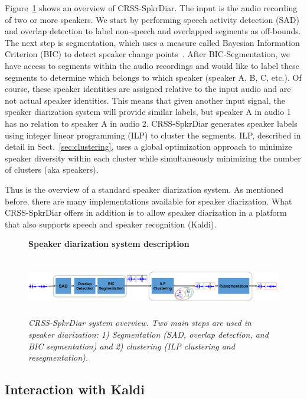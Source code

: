 Figure~\ref{fig:crssdiar} shows an overview of CRSS-SpkrDiar. 
The input is the audio recording of two or more speakers. 
We start by performing speech activity detection (SAD) and overlap detection to label non-speech and overlapped segments as off-bounds. 
The next step is segmentation, which uses a measure called Bayesian Information Criterion (BIC) to detect speaker change points~\cite{chen1998BIC}. 
After BIC-Segmentation, we have access to segments within the audio recordings and would like to label these segments to determine which belongs to which speaker (speaker A, B, C, etc.). 
Of course, these speaker identities are assigned relative to the input audio and are not actual speaker identities. 
This means that given another input signal, the speaker diarization system will provide similar labels, but speaker A in audio 1 has no relation to speaker A in audio 2. 
CRSS-SpkrDiar generates speaker labels using integer linear programming (ILP) to cluster the segments. 
ILP, described in detail in Sect.~\ref{sec:clustering}, uses a global optimization approach to minimize speaker diversity within each cluster while simultaneously minimizing the number of clusters (aka speakers). 

Thus is the overview of a standard speaker diarization system. 
As mentioned before, there are many implementations available for speaker diarization. 
What CRSS-SpkrDiar offers in addition is to allow speaker diarization in a platform that also supports speech and speaker recognition (Kaldi). 


\begin{figure}[t!]
	\centering
	\textbf{Speaker diarization system description}\par\medskip
	\includegraphics[height = 1in, width=1\textwidth]{figures/crssdiar_outline}
	\caption{\it \small CRSS-SpkrDiar system overview. Two main steps are used in speaker diarization: 1) Segmentation (SAD, overlap detection, and BIC segmentation) and 2) clustering (ILP clustering and resegmentation). }
	\label{fig:crssdiar}
	\vspace{-3mm}
\end{figure}

\subsection{Interaction with Kaldi}
\label{ssec:crssdiar_and_kaldi}

